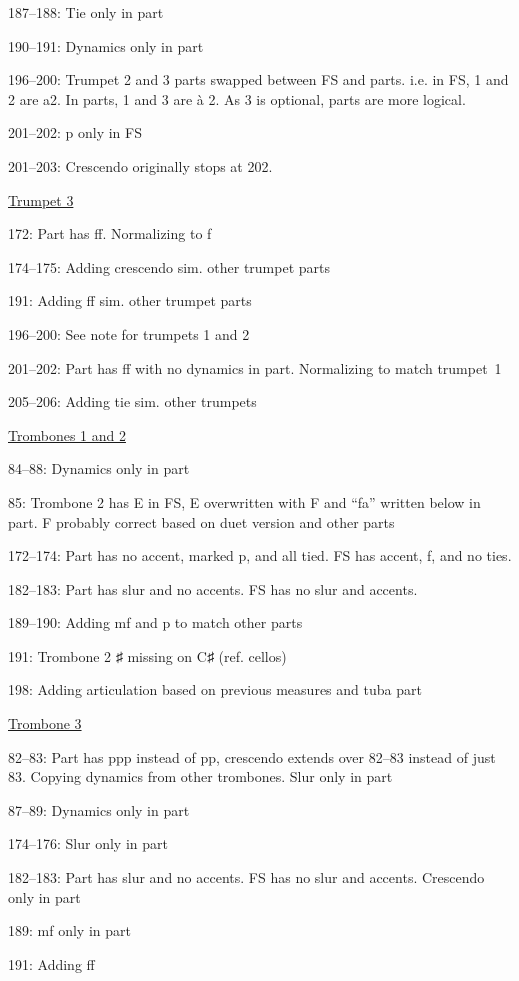 \documentclass[twoside]{article}
\begin{document}
\begin{hangparas}{15pt}{1}
\begin{multicols}{2}
187--188: Tie only in part

190--191: Dynamics only in part

196--200: Trumpet 2 and 3 parts swapped between FS and parts. i.e. in FS, 1 and 2 are a2. In parts, 1 and 3 are à 2. As 3 is optional, parts are more logical.

201--202: p only in FS

201--203: Crescendo originally stops at 202.

\underline{Trumpet 3}

172: Part has ff. Normalizing to f

174--175: Adding crescendo sim. other trumpet parts

191: Adding ff sim. other trumpet parts

196--200: See note for trumpets 1 and 2

201--202: Part has ff with no dynamics in part. Normalizing to match trumpet~1

205--206: Adding tie sim. other trumpets

\break

\underline{Trombones 1 and 2}

84--88: Dynamics only in part

85: Trombone 2 has E in FS, E overwritten with F and ``fa'' written below in part. F probably correct based on duet version and other parts

172--174: Part has no accent, marked p, and all tied. FS has accent, f, and no ties.

182--183: Part has slur and no accents. FS has no slur and accents.

189--190: Adding mf and p to match other parts

191: Trombone 2 ♯ missing on C♯ (ref. cellos)

198: Adding articulation based on previous measures and tuba part

\underline{Trombone 3}

82--83: Part has ppp instead of pp, crescendo extends over 82--83 instead of just 83. Copying dynamics from other trombones. Slur only in part

87--89: Dynamics only in part

174--176: Slur only in part

182--183: Part has slur and no accents. FS has no slur and accents. Crescendo only in part

189: mf only in part

191: Adding ff


\end{multicols}
\end{hangparas}
\end{document}
